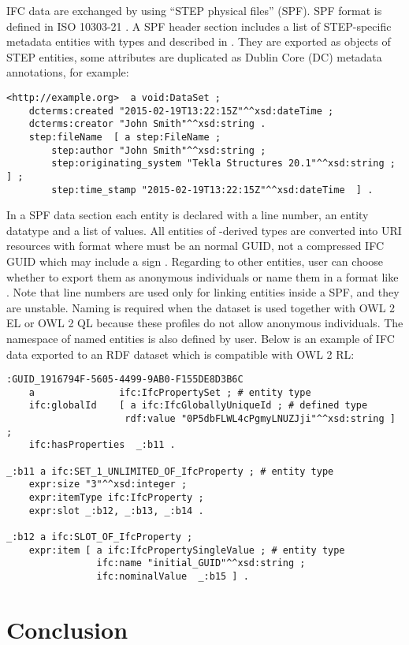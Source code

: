 IFC data are exchanged by using ``STEP physical files'' (SPF). SPF format is defined in ISO 10303-21 \cite{wiki:step-file}. A SPF header section includes a list of STEP-specific metadata entities with types   and  described in \cite{buildingSMART:ifc-header}. They are exported as objects of STEP entities, some attributes are duplicated as Dublin Core (DC) metadata annotations, for example:

\begin{lstlisting}
<http://example.org>  a void:DataSet ;
    dcterms:created "2015-02-19T13:22:15Z"^^xsd:dateTime ;
    dcterms:creator "John Smith"^^xsd:string .
    step:fileName  [ a step:FileName ;
        step:author "John Smith"^^xsd:string ;
        step:originating_system "Tekla Structures 20.1"^^xsd:string ; ] ;
        step:time_stamp "2015-02-19T13:22:15Z"^^xsd:dateTime  ] .
\end{lstlisting}


In a SPF data section each entity is declared with a line number, an entity data\-type and a list of values. All entities of -derived types are converted into URI resources with format  where  must be an normal GUID, not a compressed IFC GUID which may include a sign \name{\$}. Regarding to other entities, user can choose whether to export them as anonymous individuals or name them in a format like . Note that line numbers are used only for linking entities inside a SPF, and they are unstable. Naming is required when the dataset is used together with OWL 2 EL or OWL 2 QL because these profiles do not allow anonymous individuals. The namespace of named entities is also defined by user. Below is an example of IFC data exported to an RDF dataset which is compatible with OWL 2 RL:

\begin{lstlisting}
:GUID_1916794F-5605-4499-9AB0-F155DE8D3B6C
    a               ifc:IfcPropertySet ; # entity type
    ifc:globalId    [ a ifc:IfcGloballyUniqueId ; # defined type
                     rdf:value "0P5dbFLWL4cPgmyLNUZJji"^^xsd:string ] ;
    ifc:hasProperties  _:b11 .
    
_:b11 a ifc:SET_1_UNLIMITED_OF_IfcProperty ; # entity type
    expr:size "3"^^xsd:integer ;
    expr:itemType ifc:IfcProperty ;
    expr:slot _:b12, _:b13, _:b14 .
    
_:b12 a ifc:SLOT_OF_IfcProperty ;
    expr:item [ a ifc:IfcPropertySingleValue ; # entity type
                ifc:name "initial_GUID"^^xsd:string ;
                ifc:nominalValue  _:b15 ] .
\end{lstlisting}


\section{Conclusion}
\label{sec:conclusion}